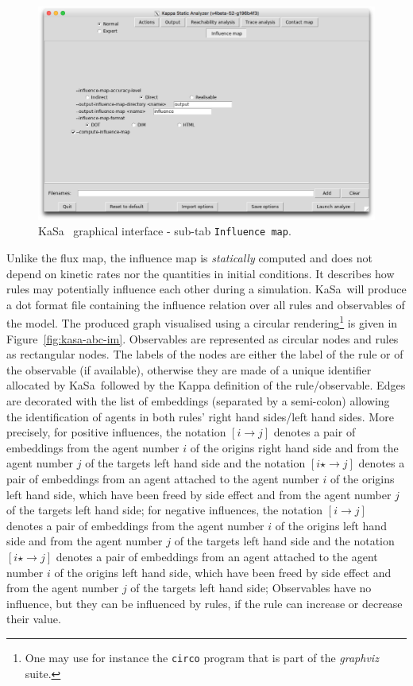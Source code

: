 \documentclass[11pt]{book}
\def\KaSa{\textsf{KaSa}}
\def\ttt#1{\texttt{#1}}
\def\rar{\rightarrow}
\begin{document}
\begin{figure}[htbp]
\centering
\includegraphics[width=12cm,bb=0 0 1904 1208]{img/kasa_5.png}
\caption{\KaSa~ graphical interface - sub-tab \texttt{Influence map}.}
\label{fig:kasa:4}
\end{figure}

Unlike the flux map, the influence map is \emph{statically} computed and does not depend on kinetic rates nor the quantities in initial conditions. It describes how rules may potentially influence each other during a simulation. \KaSa~will produce a dot format file containing the influence relation over all rules and observables of the model. The produced graph visualised using a circular rendering\footnote{One may use for instance the \ttt{circo} program that is part of the \textit{graphviz} suite.} is given in Figure~\ref{fig:kasa-abc-im}. Observables are represented as circular nodes and rules as rectangular nodes. The labels of the nodes are either the label of the rule or of the observable (if available), otherwise they are made of a unique identifier allocated by \KaSa~followed by the Kappa definition of the rule/observable.
Edges are decorated with the list of embeddings (separated by a semi-colon) allowing the identification of agents in both rules' right hand sides/left hand sides.
More precisely, for positive influences,  the notation $[i\rar j]$ denotes a pair of embeddings from the agent number $i$ of the origin{\textquotesingle}s right hand side and from the agent number $j$ of the target{\textquotesingle}s left hand side and the notation $[i\star \rar j]$ denotes a pair of embeddings from an agent attached to the agent number $i$  of the origin{\textquotesingle}s left hand side, which have been freed by side effect  and   from the agent number $j$ of the target{\textquotesingle}s left hand side; for negative influences,  the notation $[i\rar j]$ denotes a pair of embeddings from the agent number $i$ of the origin{\textquotesingle}s left hand side and from the agent number $j$ of the target{\textquotesingle}s left hand side and the notation $[i\star \rar j]$ denotes a pair of embeddings from an agent attached to the agent number $i$  of the origin{\textquotesingle}s left hand side, which have been freed by side effect  and   from the agent number $j$ of the target{\textquotesingle}s left hand side;
 Observables have no influence, but they can be influenced by rules, if the rule can increase or decrease their value.
\end{document}

